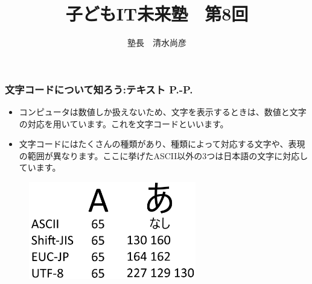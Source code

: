 \documentclass[dvipdfmx]{beamer}
\title{子どもIT未来塾　第8回}
\author{塾長　清水尚彦}
\begin{document}

\begin{frame}[fragile]
	\frametitle{文字コードについて知ろう:テキスト P.\pageref{1:P:charCode}-P.\pageref{1:P:scraping}~~~}
    \begin{itemize}
        \item コンピュータは数値しか扱えないため、文字を表示するときは、数値と文字の対応を用いています。これを文字コードといいます。
        \item 文字コードにはたくさんの種類があり、種類によって対応する文字や、表現の範囲が異なります。ここに挙げたASCII以外の3つは日本語の文字に対応しています。
    \end{itemize}
    \begin{figure}
      \centering
      \includegraphics[width=0.65\textwidth]{slide08-img004.png}
    \end{figure}
\end{frame}
\end{document}
